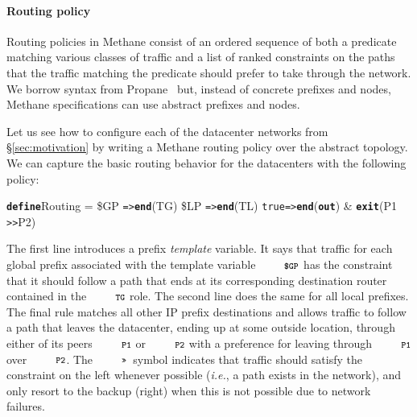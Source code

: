 \documentclass[numbers, 10pt, preprint]{sigplanconf}
\newcommand{\IE}{\emph{i.e.}}
\newcommand{\sysname}{{\small \sf Methane}\xspace}
\newcommand{\para}[1]{\paragraph*{\textbf{#1}}}
\newcommand{\CD}[1]{\texttt{\small #1}}  %
\newcommand{\KW}[1]{\texttt{\small\bfseries{#1}}}
\newcommand{\True}{\CD{true}}
\newcommand{\Define}{\KW{define}}
\newcommand{\Prefer}{\texttt{>>}}
\newcommand{\Path}{\texttt{=>}}
\newcommand{\Out}{\KW{out}}
\newcommand{\Exit}{\KW{exit}}
\newcommand{\End}{\KW{end}}
\begin{document}
%


\para{Routing policy} Routing policies in \sysname consist of an ordered sequence of both a predicate matching various classes of traffic and a list of ranked constraints on the paths that the traffic matching the predicate should prefer to take through the network. We borrow syntax from Propane~\cite{propane} but, instead of concrete prefixes and nodes, \sysname specifications can use abstract prefixes and nodes.

Let us see how to configure each of the datacenter networks from \S\ref{sec:motivation} by writing a \sysname routing policy over the abstract topology. We can capture the basic routing behavior for the datacenters with the following policy:
%
\begin{code}
\Define Routing =
    \$GP  \Path \End(TG)
    \$LP  \Path \End(TL)
    \True \Path \End(\Out) & \Exit(P1 \Prefer P2)
\end{code}
\noindent%

The first line introduces a prefix \emph{template} variable. It says that traffic for each global prefix associated with the template variable $\CD{\$GP}$ has the constraint that it should follow a path that ends at its corresponding destination router contained in the $\CD{TG}$ role. The second line does the same for all local prefixes.
%
The final rule matches all other IP prefix destinations and allows traffic to follow a path that leaves the datacenter, ending up at some outside location, through either of its peers $\CD{P1}$ or $\CD{P2}$ with a preference for leaving through $\CD{P1}$ over $\CD{P2}$. The $\CD{\Prefer}$~symbol indicates that traffic should satisfy the constraint on the left whenever possible (\IE, a path exists in the network), and only resort to the backup (right) when this is not possible due to network failures.%
\end{document}
